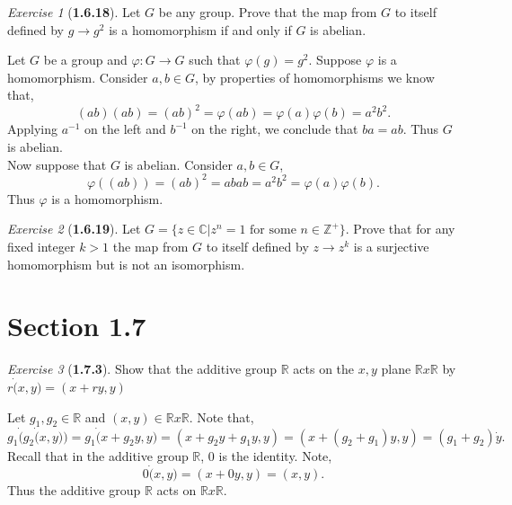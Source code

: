 \documentclass[12pt]{amsart}
\makeatletter
\theoremstyle{remark}
\newtheorem*{exercise}{Exercise}%
\def\RR{\ensuremath{\mathbb R}} %
\def\ZZ{\ensuremath{\mathbb Z}}
\def\CC{\ensuremath{\mathbb C}}
\renewenvironment{proof}[1][\proofname]{\par\doublespacing
  \pushQED{\qed}%
  \normalfont \topsep6\p@\@plus6\p@\relax
  \list{}{%
    \settowidth{\leftmargin}{\itshape\proofname:\hskip\labelsep}%
    \setlength{\labelwidth}{0pt}%
    \setlength{\itemindent}{-\leftmargin}%
  }%
  \item[\hskip\labelsep\itshape#1\@addpunct{:}]\ignorespaces
}{%
  \popQED\endlist\@endpefalse
  \singlespacing
}
\theoremstyle{mycomment}
\makeatother
\begin{document}
\begin{exercise}[\textbf{1.6.18}] Let $G$ be any group. Prove that the map from $G$ to itself defined by $g \to g^2$
  is a homomorphism if and only if $G$ is abelian.
  \begin{proof} Let $G$ be a group and $\varphi: G \to G$ such that $\varphi(g) = g^{2}$. Suppose $\varphi$ is a homomorphism. 
    Consider $a,b \in G$, by properties 
    of homomorphisms we know that, 
    \begin{equation*}
      (ab)(ab) = (ab)^2 = \varphi(ab) = \varphi(a)\varphi(b) = a^2b^2.  
    \end{equation*}
    Applying $a^{-1}$ on the left and $b^{-1}$ on the right, we conclude that $ba = ab$. Thus $G$ is abelian. \\

    Now suppose that $G$ is abelian. Consider $a,b \in G$,
    \begin{equation*}
      \varphi((ab)) = (ab)^{2} = abab = a^2b^2 = \varphi(a)\varphi(b). 
    \end{equation*}
    Thus $\varphi$ is a homomorphism.
  \end{proof}
\end{exercise}
\vspace{.15in}



\begin{exercise}[\textbf{1.6.19}] Let $G = \{ z \in \CC | z^n = 1 \text{ for some } n \in \ZZ^+ \}$. Prove that for any fixed integer $k > 1$ 
  the map from $G$ to itself defined by $z \to z^k$ is a surjective homomorphism but is not an isomorphism.\\ 
  \begin{proof} 
  \end{proof}
\end{exercise}
\vspace{.15in}


\section*{\textbf{Section 1.7}}


\begin{exercise}[\textbf{1.7.3}] Show that the additive group $\RR$ acts on the $x, y$ plane $\RR x \RR$ by $r\dot(x, y) = (x + ry, y)$\\
  \begin{proof} Let $g_1, g_2 \in \RR$ and $(x, y) \in \RR x \RR$. Note that, 
     \begin{equation*}
      g_1 \dot (g_2 \dot (x, y)) = g_1 \dot  (x + g_2y, y) = (x + g_2y + g_1y, y) = (x + (g_2 + g_1)y, y) = (g_1 + g_2) \dot y.
     \end{equation*}
     Recall that in the additive group $\RR$, 0 is the identity. Note, 
     \begin{equation*}
      0\dot(x, y) = (x + 0y, y) = (x, y).
     \end{equation*}
     Thus the additive group $\RR$ acts on $\RR x \RR$.
  \end{proof}
\end{exercise}
\vspace{.15in}
\end{document}
